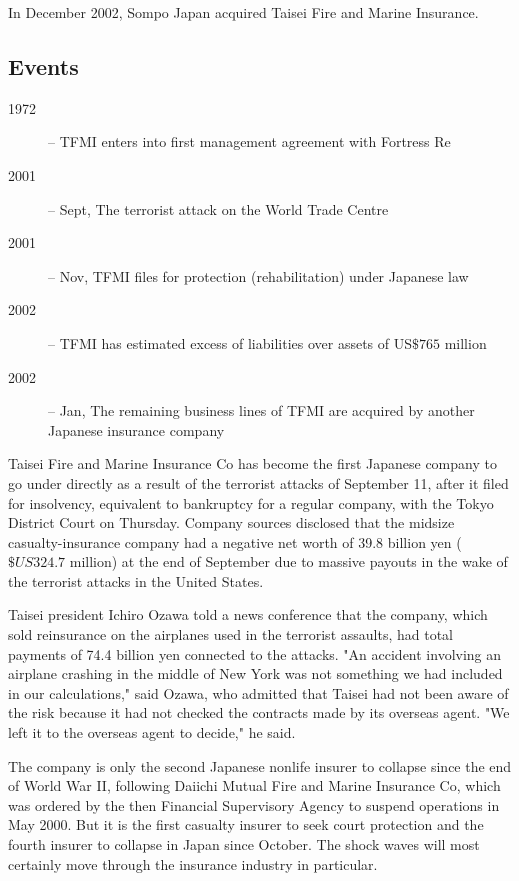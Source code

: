 \documentclass[]{article}
\begin{document}
In December 2002, Sompo Japan acquired Taisei Fire and Marine Insurance.
\subsection{Events}
\begin{description}
\item[1972] – TFMI enters into first management agreement with Fortress Re
\item[2001] – Sept, The terrorist attack on the World Trade Centre
\item[2001] – Nov, TFMI files for protection (rehabilitation) under Japanese law
\item[2002] – TFMI has estimated excess of liabilities over assets of US$\$765$ million
\item[2002] – Jan, The remaining business lines of TFMI are acquired by another Japanese insurance company
\end{description} 

Taisei Fire and Marine Insurance Co has become the first Japanese company to go under directly as a result of the terrorist attacks of September 11, after it filed for insolvency, equivalent to bankruptcy for a regular company, with the Tokyo District Court on Thursday. Company sources disclosed that the midsize casualty-insurance company had a negative net worth of 39.8 billion yen ($\$US324.7$ million) at the end of September due to massive payouts in the wake of the terrorist attacks in the United States.
 
Taisei president Ichiro Ozawa told a news conference that the company, which sold reinsurance on the airplanes used in the terrorist assaults, had total payments of 74.4 billion yen connected to the attacks. "An accident involving an airplane crashing in the middle of New York was not something we had included in our calculations," said Ozawa, who admitted that Taisei had not been aware of the risk because it had not checked the contracts made by its overseas agent. "We left it to the overseas agent to decide," he said.
 
The company is only the second Japanese nonlife insurer to collapse since the end of World War II, following Daiichi Mutual Fire and Marine Insurance Co, which was ordered by the then Financial Supervisory Agency to suspend operations in May 2000. But it is the first casualty insurer to seek court protection and the fourth insurer to collapse in Japan since October. The shock waves will most certainly move through the insurance industry in particular.
 
\end{document}
